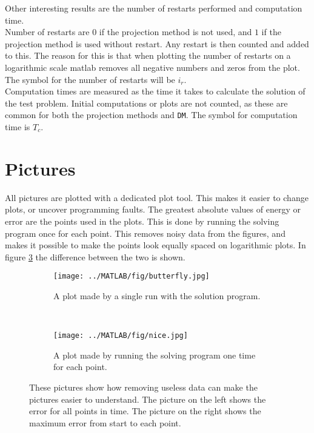 \noindent Other interesting results are the number of restarts performed and computation time. \\
Number of restarts are $0$ if the projection method is not used, and $1$ if the projection method is used without restart. Any restart is then counted and added to this. The reason for this is that when plotting the number of restarts on a logarithmic scale matlab removes all negative numbers and zeros from the plot. The symbol for the number of restarts will be $i_r$.\\
Computation times are measured as the time  it takes to calculate the solution of the test problem. Initial computations or plots are not counted, as these are common for both the projection methods and \texttt{DM}.
The symbol for computation time is $T_c$.  \\

\section{Pictures}%
All pictures are plotted with a dedicated plot tool. This makes it easier to change plots, or uncover programming faults. The greatest absolute values of energy or error are the points used in the plots. This is done by running the solving program once for each point. This removes noisy data from the figures, and makes it possible to make the points look equally spaced on logarithmic plots. In figure \ref{fig:pic} the difference between the two is shown. \\
\begin{figure}[H]
        \centering
        \begin{subfigure}[b]{0.45\textwidth}
                \texttt{[image: ../MATLAB/fig/butterfly.jpg]}
                \caption{ A plot made by a single run with the solution program. }
                \label{fig:butterfly}
        \end{subfigure}
        ~
        \begin{subfigure}[b]{0.45\textwidth}
                \texttt{[image: ../MATLAB/fig/nice.jpg]}
                \caption{ A plot made by running the solving program one time for each point. }
                \label{fig:nice}
        \end{subfigure}
        \caption{ These pictures show how removing useless data can make the pictures easier to understand. The picture on the left shows the error for all points in time. The picture on the right shows the maximum error from start to each point. }
        \label{fig:pic}
\end{figure}

